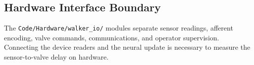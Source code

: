 \subsection{Hardware Interface Boundary}\label{sec:app_embedded_interfaces}

The \nolinkurl{Code/Hardware/walker_io/} modules separate sensor readings, afferent encoding, valve commands, communications, and operator supervision. Connecting the device readers and the neural update is necessary to measure the sensor-to-valve delay on hardware.
